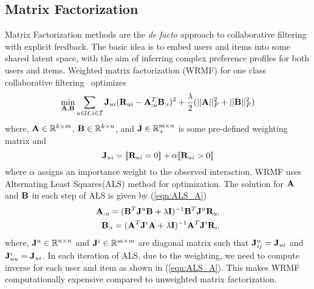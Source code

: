 \subsection{Matrix Factorization}

Matrix Factorization methods are the \emph{de facto} approach to collaborative filtering with explicit feedback. The basic idea is to embed users and items into some shared latent space, with the aim of inferring complex preference profiles for both users and items.
Weighted matrix factorization (WRMF) for one class collaborative filtering~\cite{Hu:2008, Pan:2009} optimizes
\begin{equation}
\label{eqn:wrmf}
\min_{ \mathbf{A},\mathbf{B}  } \sum_{ u \in \mathcal{U}, i \in \mathcal{I} } \mathbf{J}_{ui} ( \mathbf{R}_{ui} - \mathbf{A}_{:u}^T \mathbf{B}_{:i} )^2 + \frac{\lambda}{2}  ( ||\mathbf{A}||_F^2 + ||\mathbf{B}||_F^2 )
\end{equation}
where, $\mathbf{A}\in\mathbb{R}^{k\times m}$, $\mathbf{B}\in\mathbb{R}^{k\times n}$, and $\mathbf{J} \in \mathbb{R}_+^{m \times n}$ is some pre-defined weighting matrix  and
\begin{equation}
\label{eqn:wrmf-weight}
\mathbf{J}_{ui} =  \llbracket  \mathbf{R}_{ui} = 0  \rrbracket + \alpha \llbracket  \mathbf{R}_{ui} > 0  \rrbracket
\end{equation}
where $\alpha$ assigns an importance weight to the observed interaction.
WRMF uses Alternating Least Squares(ALS) method for optimization. The solution for $\mathbf{A}$ and $\mathbf{B}$ in each step of ALS is given by (\ref{eqn:ALS_A})
\begin{align}
	\label{eqn:ALS_A}
	\begin{split}
	\mathbf{A}_{:u} = (\mathbf{B}^T \mathbf{J}^u \mathbf{B} + \lambda \mathbf{I})^{-1} \mathbf{B}^T \mathbf{J}^u \mathbf{R}_{u:} \\
	\mathbf{B}_{:i} = (\mathbf{A}^T \mathbf{J}^i \mathbf{A} + \lambda \mathbf{I})^{-1} \mathbf{A}^T \mathbf{J}^i \mathbf{R}_{i:}
	\end{split}
\end{align}
where, $\mathbf{J}^u \in \mathbb{R}^{n \times n}$ and $\mathbf{J}^i \in \mathbb{R}^{m \times m}$ are diagonal matrix such that $ \mathbf{J}^u_{ij} = \mathbf{J}_{ui}$ and  $\mathbf{J}^i_{uu} = \mathbf{J}_{ui}$. In each iteration of ALS, due to the weighting, we need to compute inverse for each user and item as shown in (\ref{eqn:ALS_A}). This makes WRMF computationally expensive compared to unweighted matrix factorization.


